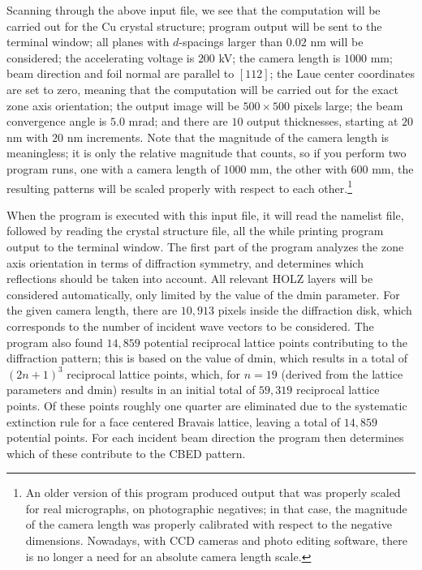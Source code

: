 \documentclass[DIV=calc, paper=letter, fontsize=11pt]{scrartcl}	 %
\begin{document}
Scanning through the above input file, we see that the computation will be carried out for the Cu crystal structure; program output will
be sent to the terminal window; all planes with $d$-spacings larger than $0.02$ nm will be considered; the accelerating voltage 
is $200$ kV; the camera length is $1000$ mm; beam direction and foil normal are parallel to $[112]$; the Laue center coordinates are
set to zero, meaning that the computation will be carried out for the exact zone axis orientation; the output image will be $500\times 500$ pixels 
large; the beam convergence angle is $5.0$ mrad; and there are $10$ output thicknesses, starting at $20$ nm with $20$ nm increments.
Note that the magnitude of the camera length is meaningless; it is only the relative magnitude that counts, so if you perform two program runs,
one with a camera length of $1000$ mm, the other with $600$ mm, the resulting patterns will be scaled properly with respect to each other.\footnote{An 
older version of this program produced output that was properly scaled for real micrographs, on photographic negatives; in that case, the 
magnitude of the camera length was properly calibrated with respect to the negative dimensions.  Nowadays, with CCD cameras and photo editing
software, there is no longer a need for an absolute camera length scale.}

When the program is executed with this input file, it will read the namelist file, followed by reading the crystal structure file, all the while
printing program output to the terminal window.  The first part of the program analyzes the zone axis orientation in terms of diffraction 
symmetry, and determines which reflections should be taken into account.  All relevant HOLZ layers will be considered automatically,
only limited by the value of the \textsf{dmin} parameter.  For the given camera length, there are $10,913$ pixels inside the diffraction disk,
which corresponds to the number of incident wave vectors to be considered.  The program also found $14,859$ potential reciprocal lattice points 
contributing to the diffraction pattern; this is based on the value of \textsf{dmin}, which results in a total of $(2n+1)^3$ reciprocal lattice 
points, which, for $n=19$ (derived from the lattice parameters and \textsf{dmin}) results in an initial total of  $59,319$ reciprocal lattice points.
Of these points roughly one quarter are eliminated due to the systematic extinction rule for a face centered Bravais lattice, leaving a total
of $14,859$ potential points.  For each incident beam direction the program then determines which of these contribute to the CBED pattern.
\end{document}
